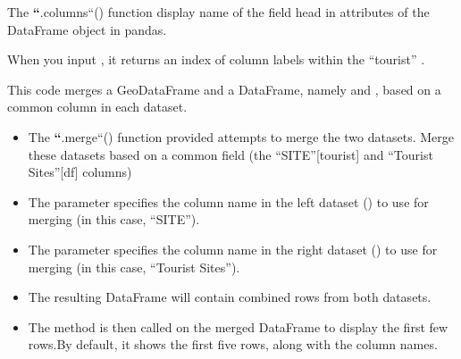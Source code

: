 \documentclass[letterpaper,10pt,english]{sphinxmanual}
\begin{document}
\begin{sphinxVerbatim}[commandchars=\\\{\}]
   
\end{sphinxVerbatim}

\sphinxAtStartPar
The {\color{red}\bfseries{}``}.columns``() function display name of the field head in attributes of the DataFrame object in pandas.

\sphinxAtStartPar
When you input , it returns an index of column labels within the “tourist” .

\begin{sphinxVerbatim}[commandchars=\\\{\}]
\end{sphinxVerbatim}

\sphinxAtStartPar
This code merges a GeoDataFrame and a DataFrame, namely  and , based on a common column in each dataset.
\begin{itemize}
\item {} 
\sphinxAtStartPar
The {\color{red}\bfseries{}``}.merge``() function provided attempts to merge the two datasets. Merge these datasets based on a common field (the “SITE”{[}tourist{]} and “Tourist Sites”{[}df{]} columns)

\item {} 
\sphinxAtStartPar
The  parameter specifies the column name in the left dataset () to use for merging (in this case, “SITE”).

\item {} 
\sphinxAtStartPar
The  parameter specifies the column name in the right dataset () to use for merging (in this case, “Tourist Sites”).

\item {} 
\sphinxAtStartPar
The resulting  DataFrame will contain combined rows from both datasets.

\item {} 
\sphinxAtStartPar
The  method is then called on the merged DataFrame to display the first few rows.By default, it shows the first five rows, along with the column names.

\end{itemize}
\end{document}
